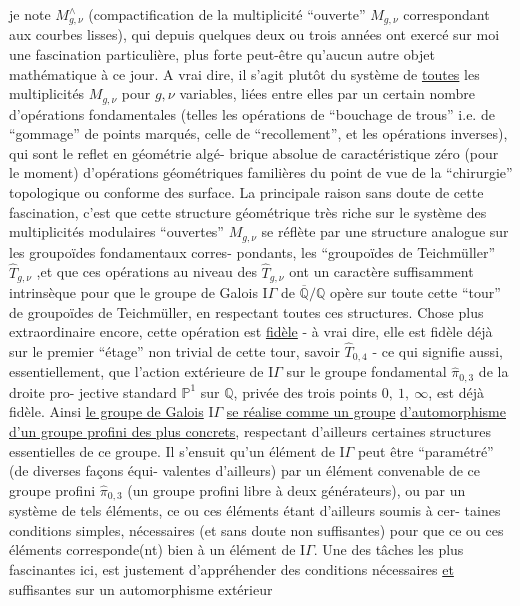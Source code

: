 \documentclass[11pt]{article}
\newcommand{\uline}[1]{\underline{#1}}
\begin{document}
je note $M^{\wedge}_{g,\nu}$ (compactification de la multiplicité ``ouverte''
$M_{g,\nu}$ correspondant aux courbes lisses), qui depuis quelques deux
ou trois années ont exercé sur moi une fascination particulière,
plus forte peut-être qu'aucun autre objet mathématique à ce jour.
A vrai dire, il s'agit plutôt du système de \uline{toutes} les multiplicités
$M_{g,\nu}$ pour $g,\nu$ variables, liées entre elles par un certain nombre
d'opérations fondamentales (telles les opérations de ``bouchage de
trous'' i.e. de ``gommage'' de points marqués, celle de ``recollement'',
et les opérations inverses), qui sont le reflet en géométrie algé-%
brique absolue de caractéristique zéro (pour le moment) d'opérations
géométriques familières du point de vue de la ``chirurgie'' topologique
ou conforme des surface. La principale raison sans doute de cette
fascination, c'est que cette structure géométrique très riche sur le
système des multiplicités modulaires ``ouvertes'' $M_{g,\nu}$ se réflète
par une structure analogue sur les groupoïdes fondamentaux corres-%
pondants, les ``groupoïdes de Teichmüller'' $\hat{T}_{g,\nu}$ ,et que ces opérations
au niveau des $\hat{T}_{g,\nu}$ ont un caractère suffisamment intrinsèque pour
que le groupe de Galois $\mathrm{I}\!\Gamma$ de $\overline{\mathbb{Q}}/\mathbb{Q}$ opère sur toute cette ``tour'' de
groupoïdes de Teichmüller, en respectant toutes ces structures. Chose
plus extraordinaire encore, cette opération est \uline{fidèle} - à vrai dire,
elle est fidèle déjà sur le premier ``étage'' non trivial de cette tour,
savoir $\hat{T}_{0,4}$ - ce qui signifie aussi, essentiellement, que l'action
extérieure de $\mathrm{I}\!\Gamma$ sur le groupe fondamental $\hat{\pi}_{0,3}$ de la droite pro-%
jective standard $\mathbb{P}^1$ sur $\mathbb{Q}$, privée des trois points $0,\ 1,\ \infty$, est
déjà fidèle. Ainsi \uline{le groupe de Galois} $\mathrm{I}\!\Gamma$ \uline{se réalise comme un groupe}
\uline{d'automorphisme d'un groupe profini des plus concrets}, respectant
d'ailleurs certaines structures essentielles de ce groupe. Il s'ensuit
qu'un élément de $\mathrm{I}\!\Gamma$ peut être ``paramétré'' (de diverses façons équi-%
valentes d'ailleurs) par un élément convenable de ce groupe profini
$\hat{\pi}_{0,3}$ (un groupe profini libre à deux générateurs), ou par un système
de tels éléments, ce ou ces éléments étant d'ailleurs soumis à cer-%
taines conditions simples, nécessaires (et sans doute non suffisantes)
pour que ce ou ces éléments corresponde(nt) bien à un élément de $\mathrm{I}\!\Gamma$.
Une des tâches les plus fascinantes ici, est justement d'appréhender
des conditions nécessaires \uline{et} suffisantes sur un automorphisme extérieur
\end{document}
